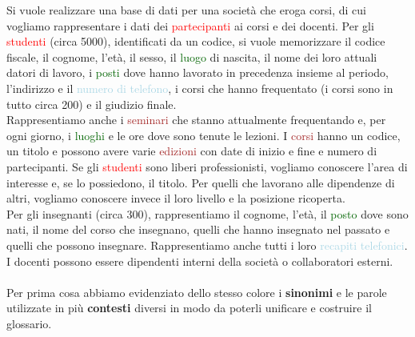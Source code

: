 \begin{example}
	Si vuole realizzare una base di dati per una società che eroga corsi, di cui vogliamo rappresentare i dati dei	\textcolor{red}{partecipanti} ai corsi e dei docenti. Per gli \textcolor{red}{studenti} (circa 5000), identificati da un codice, si vuole memorizzare il codice fiscale, il cognome, l'età, il sesso, il \textcolor{darkgreen}{luogo} di nascita, il nome dei loro attuali datori di lavoro, i \textcolor{darkgreen}{posti} dove hanno lavorato in precedenza insieme al periodo, l'indirizzo e il \textcolor{lightblue}{numero di telefono}, i corsi che hanno frequentato (i corsi sono in tutto circa 200) e il giudizio finale.\\
	Rappresentiamo anche i \textcolor{brown}{seminari} che stanno attualmente frequentando e, per ogni giorno, i \textcolor{darkgreen}{luoghi} e le ore dove sono tenute le lezioni. I \textcolor{brown}{corsi} hanno un codice, un titolo e possono avere varie \textcolor{brown}{edizioni} con date di inizio e fine e numero di partecipanti. Se gli \textcolor{red}{studenti} sono liberi professionisti, vogliamo conoscere l'area di interesse e, se lo possiedono, il titolo. Per quelli che lavorano alle dipendenze di altri, vogliamo conoscere invece il loro livello e la posizione ricoperta. \\
	Per gli insegnanti (circa 300), rappresentiamo il cognome, l'età, il \textcolor{darkgreen}{posto} dove sono nati, il nome del
	corso che insegnano, quelli che hanno insegnato nel	passato e quelli che possono insegnare. Rappresentiamo anche tutti i loro \textcolor{lightblue}{recapiti telefonici}. I docenti possono essere dipendenti interni della società o collaboratori esterni.\\\\
	
	\newpage
	Per prima cosa abbiamo evidenziato dello stesso colore i \textbf{sinonimi} e le parole utilizzate in più \textbf{contesti} diversi in modo da poterli unificare e costruire il glossario.
	

\end{example}
